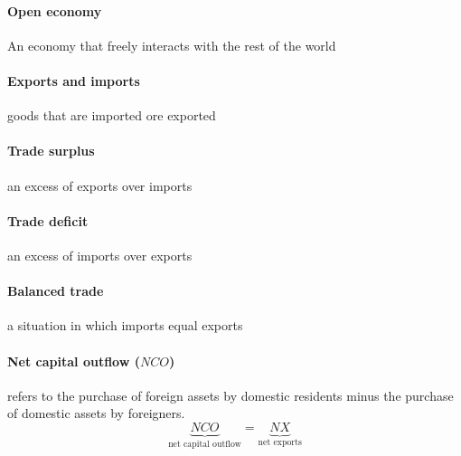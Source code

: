 \documentclass[a4paper,titlepage] {scrartcl}
\begin{document}
\paragraph{Open economy} %
\label{par:open_economy}
An economy that freely interacts with the rest of the world

\paragraph{Exports and imports} %
\label{par:exports_and_imports}
goods that are imported ore exported

\paragraph{Trade surplus} %
\label{par:trade_surplus}
an excess of exports over imports

\paragraph{Trade deficit} %
\label{par:trade_deficit}
an excess of imports over exports

\paragraph{Balanced trade} %
\label{par:balanced_trade}
a situation in which imports equal exports

\paragraph{Net capital outflow ($NCO$)} %
\label{par:net_capital_outflow_nco_}
refers to the purchase of foreign assets by domestic residents 
minus the purchase of domestic assets by foreigners.
\begin{equation}
	\underbrace{NCO}_{\text{net capital outflow}} = \underbrace{NX}_\text{{net exports}}
\end{equation}
\end{document}
